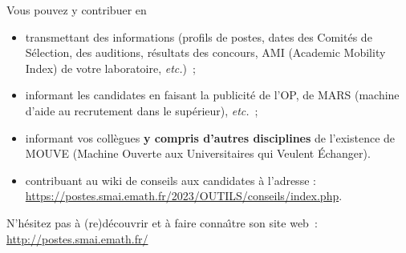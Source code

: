 Vous pouvez y contribuer en
\begin{itemize}
\item transmettant des
informations (profils de postes, dates des Comit\'es de S\'election, des auditions, r\'esultats des
concours, AMI (Academic Mobility Index) de votre laboratoire, {\em
etc.})~;
\item informant les candidat\mp e\mp s en faisant la publicit\'e de
l'OP, de MARS (machine d'aide au recrutement dans le sup\'erieur),
{\em etc.}~;
\item informant vos coll\`egues {\bf y compris d'autres
disciplines} de l'existence de MOUVE (Machine Ouverte aux
Universitaires qui Veulent
\'Echanger).
 
\item contribuant au wiki de conseils aux candidat\mp e\mp s \`a l'adresse :\\
\url{https://postes.smai.emath.fr/2023/OUTILS/conseils/index.php}.
\end{itemize}

N'h\'esitez pas \`a (re)d\'ecouvrir
et \`a faire conna\^\i  tre son site web~:
\url{http://postes.smai.emath.fr/}